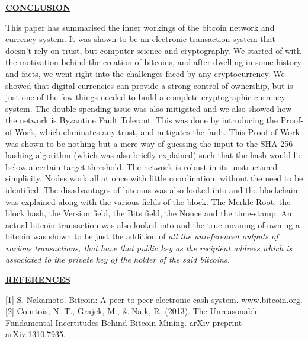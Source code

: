 \documentclass[12pt,a4paper]{report}
\begin{document}
\begin{flushleft}
\newpage
\begin{center}\underline{ \Large \textbf{CONCLUSION}}\end{center}
\vspace{10mm}
This paper has summarised the inner workings of the bitcoin network and currency system. It was shown to be an electronic transaction system that doesn't rely on  trust, but computer science and cryptography. We started of with the motivation behind the creation of bitcoins, and after dwelling in some history and facts, we went right into the challenges faced by any cryptocurrency.\newline
We showed that digital currencies can provide a strong control of ownership, but is just one of the few things needed to build a complete cryptographic currency system.
The double spending issue was also mitigated and we also showed how the network is Byzantine Fault Tolerant. This was done by introducing the Proof-of-Work, which eliminates any trust, and mitigates the fault.\newline
This Proof-of-Work was shown to be nothing but a mere way of guessing the input to the SHA-256 hashing algorithm (which was also briefly explained) such that the hash would lie below a certain target threshold.
The network is robust in its unstructured simplicity. Nodes work all at once with little coordination, without the need to be identified.\newline
The disadvantages of bitcoins was also looked into and the blockchain was explained along with the various fields of the block. The Merkle Root, the block hash, the Version field, the Bits field, the Nonce and the time-stamp. An actual bitcoin transaction was also looked into and the true meaning of owning a bitcoin was shown to be just the addition of \textit{all the unreferenced outputs of various transactions, that have that public key as the recipient address which is associated to the private key of the holder of the said bitcoins.}\newline

\newpage
\begin{center}\underline{ \Large \textbf{REFERENCES}}\end{center}

[1] S. Nakamoto. Bitcoin: A peer-to-peer electronic cash system. www.bitcoin.org.\\

[2] Courtois, N. T., Grajek, M., & Naik, R. (2013). The Unreasonable Fundamental Incertitudes Behind Bitcoin Mining. arXiv preprint arXiv:1310.7935.\\


\end{flushleft}
\end{document}
